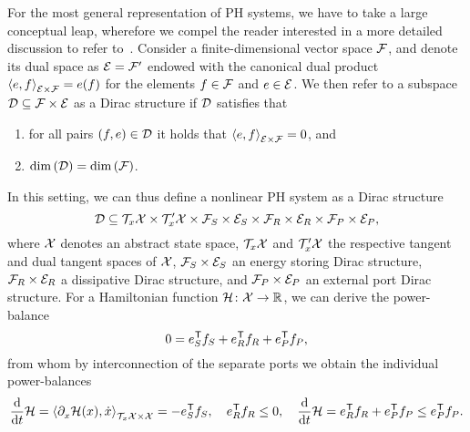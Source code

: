 \begin{remark}
    For the most general representation of \ac{PH} systems, we have to take a large conceptual leap, wherefore we compel the reader interested in a more detailed discussion to refer to~\cite[Section~2.2]{VanDerSchaft2014}.
    Consider a finite-dimensional vector space $\mathcal{F}$, and denote its dual space as $\mathcal{E} = \mathcal{F}'$ endowed with the canonical dual product ${\langle e, f \rangle}_{\mathcal{E} \times \mathcal{F}} = e(f)$ for the elements $f \in \mathcal{F}$ and $e \in \mathcal{E}$.
    We then refer to a subspace $\mathcal{D} \subseteq \mathcal{F} \times \mathcal{E}$ as a Dirac structure if $\mathcal{D}$ satisfies that
    \begin{enumerate}
        \item for all pairs $(f, e) \in \mathcal{D}$ it holds that ${\langle e, f \rangle}_{\mathcal{E} \times \mathcal{F}} = 0$, and
        \item $\dim{(\mathcal{D})} = \dim{(\mathcal{F})}$.
    \end{enumerate}
    In this setting, we can thus define a nonlinear \ac{PH} system as a Dirac structure
    \begin{equation*}
        \mathcal{D} \subseteq \mathcal{T}_x \mathcal{X} \times \mathcal{T}'_x \mathcal{X} \times \mathcal{F}_S \times \mathcal{E}_S \times \mathcal{F}_R \times \mathcal{E}_R \times \mathcal{F}_P \times \mathcal{E}_P,
    \end{equation*}
    where $\mathcal{X}$ denotes an abstract state space, $\mathcal{T}_x \mathcal{X}$ and $\mathcal{T}'_x \mathcal{X}$ the respective tangent and dual tangent spaces of $\mathcal{X}$, $\mathcal{F}_S \times \mathcal{E}_S$ an energy storing Dirac structure, $\mathcal{F}_R \times \mathcal{E}_R$ a dissipative Dirac structure, and $\mathcal{F}_P \times \mathcal{E}_P$ an external port Dirac structure.
    For a Hamiltonian function $\mathcal{H} \colon \mathcal{X} \to \mathbb{R}$, we can derive the power-balance
    \begin{equation*}
        0 = e_S^{\mkern1mu \mathsf{T}} f_S + e_R^{\mkern1mu \mathsf{T}} f_R + e_P^{\mkern1mu \mathsf{T}} f_P,
    \end{equation*}
    from whom by interconnection of the separate ports we obtain the individual power-balances
    \begin{equation*}
        \frac{\mathop{}\!\mathrm{d}}{\mathop{}\!\mathrm{d} t} \mathcal{H} = {\langle \partial_{x}^{} \mathcal{H}(x), \dot{x} \rangle}_{\mathcal{T}_x \mathcal{X} \times \mathcal{X}} = -e_S^{\mkern1mu \mathsf{T}} f_S,\quad e_R^{\mkern1mu \mathsf{T}} f_R \leq 0,\quad \frac{\mathop{}\!\mathrm{d}}{\mathop{}\!\mathrm{d} t} \mathcal{H} = e_R^{\mkern1mu \mathsf{T}} f_R + e_P^{\mkern1mu \mathsf{T}} f_P \leq e_P^{\mkern1mu \mathsf{T}} f_P.
    \end{equation*}
\end{remark}
